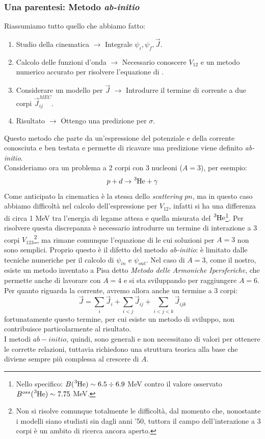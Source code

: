 \subsubsection{Una parentesi: Metodo \textit{ab-initio}}\label{0318-sec-abinitio} Riassumiamo tutto quello che abbiamo fatto:
\begin{enumerate}[1]
    \item Studio della cinematica $\to$ Integrale $\psi_i,\psi_f,\vec{J}$.
    \item Calcolo delle funzioni d'onda $\to$ Necessario conoscere $V_{12}$ e un metodo numerico accurato per risolvere l'equazione di \Sch.
    \item Considerare un modello  per $\vec{J}$ $\to$ Introdurre il termine di corrente a due corpi $\vec{J}^{MEC}_{ij}$.
    \item Risultato $\to$ Ottengo una predizione per $\sigma$.
\end{enumerate}
Questo metodo che parte da un'espressione del potenziale e della corrente conosciuta e ben testata e permette di ricavare una predizione viene definito \textit{ab-initio}.\\
Consideriamo ora un problema a 2 corpi con 3 nucleoni ($A=3$), per esempio:
$$p+d\to \ce{^3He}+\gamma$$
Come anticipato la cinematica è la stessa dello \textit{scattering} $pn$, ma in questo caso abbiamo difficoltà nel calcolo dell'espressione per $V_{12}$, infatti si ha una differenza di circa 1 MeV tra l'energia di legame attesa e quella misurata del $\ce{^3He}$\footnote{Nello specifico: $B(\ce{^3He})\sim6.5\div 6.9$ MeV contro il valore osservato $B^{oss}(\ce{^3He})\sim7.75$ MeV.%
}. Per risolvere questa discrepanza è necessario introdurre un termine di interazione a 3 corpi $V_{123}$\footnote{Non si risolve comunque totalmente le difficoltà, dal momento che, nonostante i modelli siano studiati sin dagli anni '50, tuttora il campo dell'interazione a 3 corpi è un ambito di ricerca ancora aperto.}, ma rimane comunque l'equazione di \Sch{}le cui soluzioni per $A=3$ non sono semplici. Proprio questo è il difetto del metodo \textit{ab-initio}: è limitato dalle tecniche numeriche per il calcolo di $\psi_{in}$ e $\psi_{out}$. Nel caso di $A=3$, come il nostro, esiste un metodo inventato a Pisa detto \textit{Metodo delle Armoniche Ipersferiche}, che permette anche di lavorare con $A=4$ e si sta sviluppando per raggiungere $A=6$.\\
Per quanto riguarda la corrente, avremo allora anche un termine a 3 corpi:
$$\vec{J} = \sum_i \vec{J}_i + \sum_{i<j} \vec{J}_{ij} + \sum_{i<j<k} \vec{J}_{ijk}$$
fortunatamente questo termine, per cui esiste un metodo di sviluppo, non contribuisce particolarmente al risultato.\\
I metodi $ab-initio$, quindi, sono generali e non necessitano di  valori per ottenere le corrette relazioni, tuttavia richiedono una struttura teorica alla base che diviene sempre più complessa al crescere di $A$.

